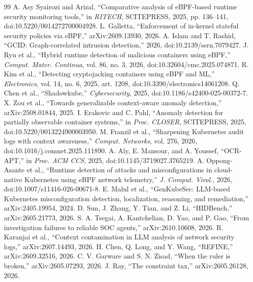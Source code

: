 \documentclass[conference]{IEEEtran}
\begin{document}
\begin{thebibliography}{99}
 A. Asy Syairozi and Arizal, ``Comparative analysis of eBPF-based runtime security monitoring tools,'' in \emph{RITECH}, SCITEPRESS, 2025, pp. 136--141, doi:10.5220/0014272700004928.
 L. Galletta, ``Enforcement of in-kernel stateful security policies via eBPF,'' arXiv:2609.13930, 2026.
 A. Islam and T. Rashid, ``GCID: Graph-correlated intrusion detection,'' 2026, doi:10.2139/ssrn.7079427.
 J. Ryu et al., ``Hybrid runtime detection of malicious containers using eBPF,'' \emph{Comput. Mater. Continua}, vol. 86, no. 3, 2026, doi:10.32604/cmc.2025.074871.
 R. Kim et al., ``Detecting cryptojacking containers using eBPF and ML,'' \emph{Electronics}, vol. 14, no. 6, 2025, art. 1208, doi:10.3390/electronics14061208.
 Q. Chen et al., ``Shadowkube,'' \emph{Cybersecurity}, 2025, doi:10.1186/s42400-025-00372-7.
 X. Zou et al., ``Towards generalizable context-aware anomaly detection,'' arXiv:2508.01844, 2025.
 I. Erakovic and C. Pahl, ``Anomaly detection for partially observable container systems,'' in \emph{Proc. CLOSER}, SCITEPRESS, 2025, doi:10.5220/0013224900003950.
 M. Franzil et al., ``Sharpening Kubernetes audit logs with context awareness,'' \emph{Comput. Networks}, vol. 276, 2026, doi:10.1016/j.comnet.2025.111890.
 A. Aly, E. Mansour, and A. Youssef, ``OCR-APT,'' in \emph{Proc. ACM CCS}, 2025, doi:10.1145/3719027.3765219.
 A. Oppong-Asante et al., ``Runtime detection of attacks and misconfigurations in cloud-native Kubernetes using eBPF network telemetry,'' \emph{J. Comput. Virol.}, 2026, doi:10.1007/s11416-026-00671-8.
 E. Malul et al., ``GenKubeSec: LLM-based Kubernetes misconfiguration detection, localization, reasoning, and remediation,'' arXiv:2405.19954, 2024.
 D. Sun, J. Zhang, Y. Tian, and Z. Li, ``HIDBench,'' arXiv:2605.21773, 2026.
 S. A. Tsegai, A. Kantchelian, D. Yao, and P. Gao, ``From investigation failures to reliable SOC agents,'' arXiv:2610.10608, 2026.
 R. Karanjai et al., ``Context contamination in LLM analysis of network security logs,'' arXiv:2607.14493, 2026.
 H. Chen, Q. Long, and Y. Wang, ``REFINE,'' arXiv:2609.32516, 2026.
 C. V. Garware and S. N. Zisad, ``When the ruler is broken,'' arXiv:2605.07293, 2026.
 J. Ray, ``The constraint tax,'' arXiv:2605.26128, 2026.

\end{thebibliography}
\end{document}
